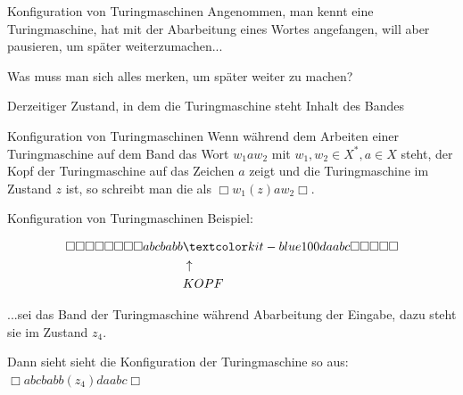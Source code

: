 \documentclass{beamer}
\begin{document}
\begin{frame}{Konfiguration von Turingmaschinen}
	Angenommen, man kennt eine Turingmaschine, hat mit der Abarbeitung eines Wortes angefangen, will aber pausieren, um später weiterzumachen...
	
	\vspace{.2cm}
	
	Was muss man sich alles merken, um später weiter zu machen?
	
	\begin{itemize}
		\pitem Derzeitiger Zustand, in dem die Turingmaschine steht
		\pitem Inhalt des Bandes
	\end{itemize}

	\bp
	\vspace{.2cm}
	
	\begin{block}{Konfiguration von Turingmaschinen}
		Wenn während dem Arbeiten einer Turingmaschine auf dem Band das Wort $w_1 a w_2$ mit $w_1, w_2 \in X^*, a \in X$ steht\ip, der Kopf der Turingmaschine auf das Zeichen $a$ zeigt \ip und die Turingmaschine im Zustand $z$ ist\ip, so schreibt man die  als $\Box w_1 (z) a w_2 \Box $.
	\end{block}
\end{frame}

\begin{frame}{Konfiguration von Turingmaschinen}
	Beispiel:
	
	\vspace{.2cm}
	
	\begin{align*}
	\Box\Box\Box\Box\Box\Box\Box\Box abcbabb&\markBlue{d}aabc \Box\Box\Box\Box\Box \\
	&\uparrow \\
	&KOPF
	\end{align*}
	
	\bp
	...sei das Band der Turingmaschine während Abarbeitung der Eingabe, dazu steht sie im Zustand $z_4$.
	
	\vspace{.2cm}
	
	\bp
	Dann sieht sieht die Konfiguration der Turingmaschine so aus: \ip $\Box abcbabb (z_4) daabc \Box$
\end{frame}
\end{document}
